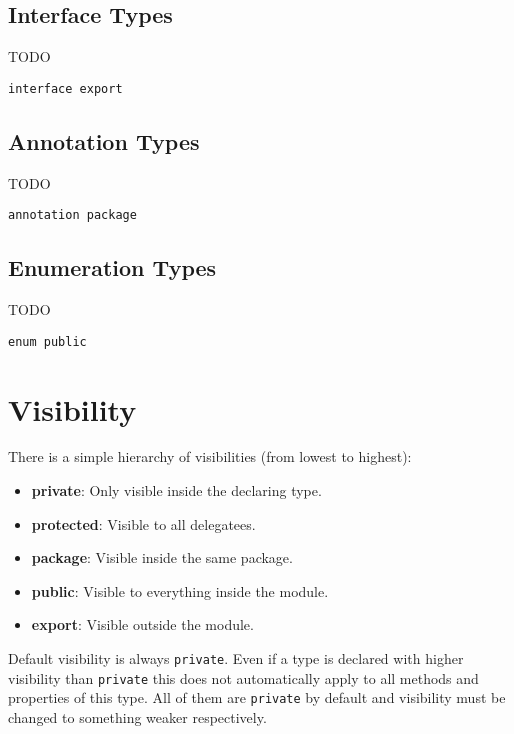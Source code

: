 \documentclass[11pt,a4paper]{report}
\begin{document}
\subsection{Interface Types}

TODO

\begin{lstlisting}[language=CayThe, title=foo/bar/Baz.ct]
    interface export    
\end{lstlisting}


\subsection{Annotation Types}

TODO

\begin{lstlisting}[language=CayThe, title=foo/bar/Baz.ct]
    annotation package
\end{lstlisting}

\subsection{Enumeration Types}

TODO

\begin{lstlisting}[language=CayThe, title=foo/bar/Baz.ct]
    enum public    
\end{lstlisting}

\section{Visibility}

There is a simple hierarchy of visibilities (from lowest to highest):

\begin{itemize}
    \item \textbf{private}: Only visible inside the declaring type.
    \item \textbf{protected}: Visible to all delegatees.
    \item \textbf{package}: Visible inside the same package.
    \item \textbf{public}: Visible to everything inside the module.
    \item \textbf{export}: Visible outside the module.
\end{itemize}

Default visibility is always \texttt{private}. Even if a type is declared with higher visibility than \texttt{private} this does not automatically apply to all methods and properties of this type. All of them are \texttt{private} by default and visibility must be changed to something weaker respectively.
\end{document}
